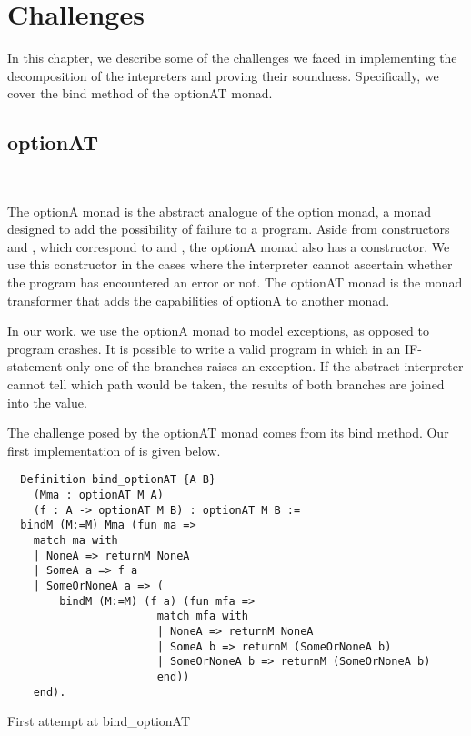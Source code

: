 \chapter{Challenges}

In this chapter, we describe some of the challenges we faced in implementing
the decomposition of the intepreters and proving their soundness. Specifically,
we cover the bind method of the optionAT monad.

\section{optionAT}~\label{sec:challenges-optionat}

The optionA monad is the abstract analogue of the option monad, a monad
designed to add the possibility of failure to a program. Aside from
constructors  and , which correspond to  and
, the optionA monad also has a  constructor.
We use this constructor in the cases where the interpreter cannot ascertain
whether the program has encountered an error or not. The optionAT monad is the
monad transformer that adds the capabilities of optionA to another monad.

In our work, we use the optionA monad to model exceptions, as opposed to
program crashes. It is possible to write a valid program in which in an
IF-statement only one of the branches raises an exception. If the abstract
interpreter cannot tell which path would be taken, the results of both branches
are joined into the  value.

The challenge posed by the optionAT monad comes from its bind method. Our
first implementation of  is given below.

\begin{listing}[H]
\begin{verbatim}
  Definition bind_optionAT {A B} 
    (Mma : optionAT M A)
    (f : A -> optionAT M B) : optionAT M B :=
  bindM (M:=M) Mma (fun ma =>
    match ma with
    | NoneA => returnM NoneA
    | SomeA a => f a
    | SomeOrNoneA a => (
        bindM (M:=M) (f a) (fun mfa =>
                       match mfa with
                       | NoneA => returnM NoneA
                       | SomeA b => returnM (SomeOrNoneA b)
                       | SomeOrNoneA b => returnM (SomeOrNoneA b)
                       end))
    end).
\end{verbatim}
\caption{First attempt at bind\_optionAT}
\label{lst:bind_optionAT}
\end{listing}

